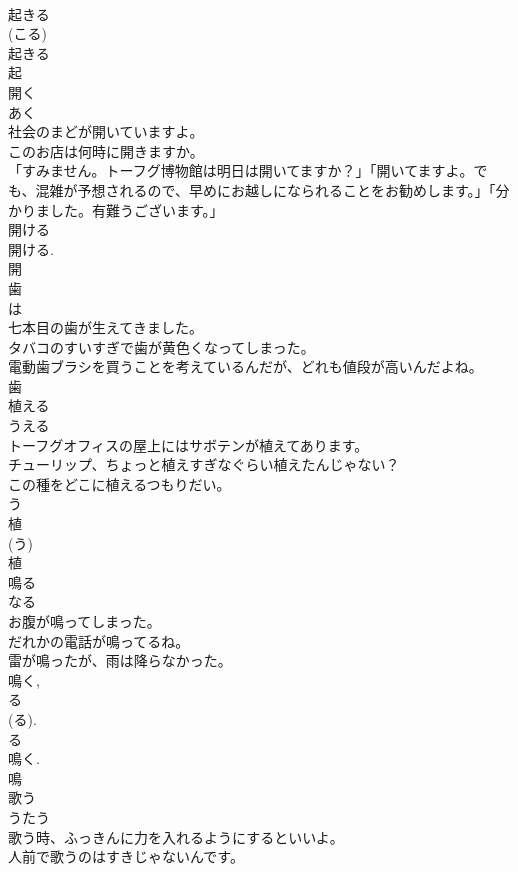 \documentclass[8pt]{extreport}
\begin{document}
\begin{CJK}{UTF8}{min}
\\	起きる 
\\	(こる) 
\\	起きる 
\\	起	
\\	開く	
\\	あく	
\\	社会のまどが開いていますよ。	
\\	このお店は何時に開きますか。	
\\	「すみません。トーフグ博物館は明日は開いてますか？」「開いてますよ。でも、混雑が予想されるので、早めにお越しになられることをお勧めします。」「分かりました。有難うございます。」	
\\	開ける 
\\	開ける. 
\\	開	
\\	歯	
\\	は	
\\	七本目の歯が生えてきました。	
\\	タバコのすいすぎで歯が黄色くなってしまった。	
\\	電動歯ブラシを買うことを考えているんだが、どれも値段が高いんだよね。	
\\	歯	
\\	植える	
\\	うえる	
\\	トーフグオフィスの屋上にはサボテンが植えてあります。	
\\	チューリップ、ちょっと植えすぎなぐらい植えたんじゃない？	
\\	この種をどこに植えるつもりだい。	
\\	う 
\\	植 
\\	(う) 
\\	植	
\\	鳴る	
\\	なる	
\\	お腹が鳴ってしまった。	
\\	だれかの電話が鳴ってるね。	
\\	雷が鳴ったが、雨は降らなかった。	
\\	鳴く, 
\\	る 
\\	(る). 
\\	る 
\\	鳴く. 
\\	鳴	
\\	歌う	
\\	うたう	
\\	歌う時、ふっきんに力を入れるようにするといいよ。	
\\	人前で歌うのはすきじゃないんです。	

\end{CJK}
\end{document}
